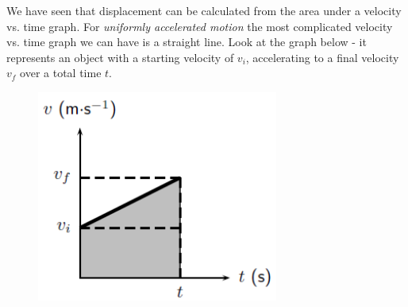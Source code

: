           
          \label{m38796*id76415}We have seen that displacement can be calculated from the area under a velocity vs. time graph. For \textsl{uniformly accelerated motion} the most complicated velocity vs. time graph we can have is a straight line. Look at the graph below - it represents an object with a starting velocity of \textsl{\begin{math}{v}_{i}\end{math}}, accelerating to a final velocity \textsl{\begin{math}{v}_{f}\end{math}} over a total time \textsl{\begin{math}t\end{math}}.\par 
          \label{m38796*id76474}
            
    \setcounter{subfigure}{0}


	\begin{figure}[H] %
    \begin{center}
    \label{m38796*id76477!!!underscore!!!media}\label{m38796*id76477!!!underscore!!!printimage}\includegraphics[width=300px]{col11305.imgs/m38796_PG10C2_045.png} %
        
      \vspace{2pt}
    \vspace{.1in}
    
    \end{center}

 \end{figure}   

    \addtocounter{footnote}{-0}
    
